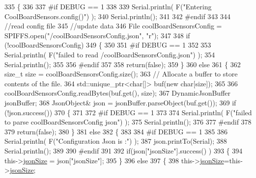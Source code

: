 \begin{DoxyCode}
335 \{
336 
337 \textcolor{preprocessor}{#if DEBUG == 1}
338 
339     Serial.println( F(\textcolor{stringliteral}{"Entering CoolBoardSensors.config()"}) );
340     Serial.println();
341 
342 \textcolor{preprocessor}{#endif}
343 
344     \textcolor{comment}{//read config file}
345     \textcolor{comment}{//update data}
346     File coolBoardSensorsConfig = SPIFFS.open(\textcolor{stringliteral}{"/coolBoardSensorsConfig.json"}, \textcolor{stringliteral}{"r"});
347 
348     \textcolor{keywordflow}{if} (!coolBoardSensorsConfig) 
349     \{
350     
351 \textcolor{preprocessor}{    #if DEBUG == 1}
352 
353         Serial.println( F(\textcolor{stringliteral}{"failed to read /coolBoardSensorsConfig.json"}) );
354         Serial.println();
355     
356 \textcolor{preprocessor}{    #endif}
357 
358         \textcolor{keywordflow}{return}(\textcolor{keyword}{false});
359     \}
360     \textcolor{keywordflow}{else}
361     \{
362         \textcolor{keywordtype}{size\_t} size = coolBoardSensorsConfig.size();
363         \textcolor{comment}{// Allocate a buffer to store contents of the file.}
364         std::unique\_ptr<char[]> buf(\textcolor{keyword}{new} \textcolor{keywordtype}{char}[size]);
365 
366         coolBoardSensorsConfig.readBytes(buf.get(), size);
367         DynamicJsonBuffer jsonBuffer;
368         JsonObject& json = jsonBuffer.parseObject(buf.get());
369         \textcolor{keywordflow}{if} (!json.success()) 
370         \{
371         
372 \textcolor{preprocessor}{        #if DEBUG == 1}
373 
374             Serial.println( F(\textcolor{stringliteral}{"failed to parse coolBoardSensorsConfig json"}) );
375             Serial.println();
376         
377 \textcolor{preprocessor}{        #endif}
378     
379             \textcolor{keywordflow}{return}(\textcolor{keyword}{false});
380         \} 
381         \textcolor{keywordflow}{else}
382         \{
383 
384 \textcolor{preprocessor}{        #if DEBUG == 1}
385 
386             Serial.println( F(\textcolor{stringliteral}{"Configuration Json is :"}) );
387             json.printTo(Serial);
388             Serial.println();
389         
390 \textcolor{preprocessor}{        #endif}
391       
392             \textcolor{keywordflow}{if}(json[\textcolor{stringliteral}{"jsonSize"}].success() )
393             \{
394                 this->\hyperlink{classCoolBoardSensors_a05a40dc80bfff14ffb830f549b876f8d}{jsonSize} = json[\textcolor{stringliteral}{"jsonSize"}]; 
395             \}
396             \textcolor{keywordflow}{else}
397             \{
398                 this->\hyperlink{classCoolBoardSensors_a05a40dc80bfff14ffb830f549b876f8d}{jsonSize}=this->\hyperlink{classCoolBoardSensors_a05a40dc80bfff14ffb830f549b876f8d}{jsonSize};          

\end{DoxyCode}
